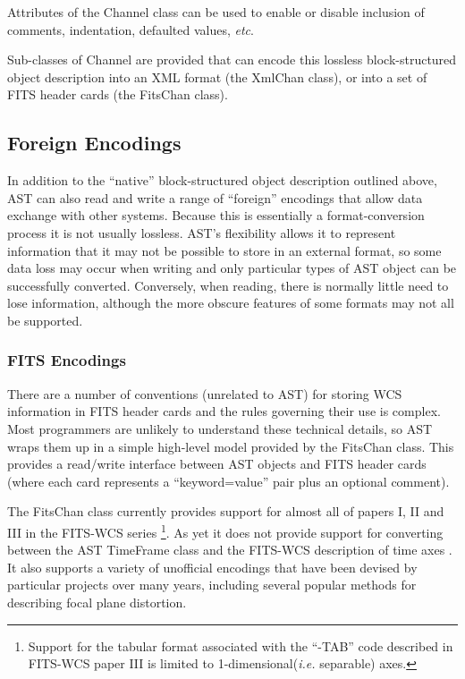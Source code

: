 \documentclass[final,authoryear,5p,times,twocolumn]{elsarticle}
\begin{document}
Attributes of the Channel class can be used to enable or disable
inclusion of comments, indentation, defaulted values, \emph{etc}.

Sub-classes of Channel are provided that can encode this lossless
block-structured object description into an XML format (the XmlChan
class), or into a set of FITS header cards (the FitsChan class).

\subsection{Foreign Encodings}

In addition to the ``native'' block-structured object description outlined
above, AST can also read and write a range of ``foreign'' encodings that
allow data exchange with other systems. Because this is essentially a
format-conversion process it is not usually lossless. AST's flexibility
allows it to represent information that it may not be possible to store
in an external format, so some data loss may occur when writing and only
particular types of AST object can be successfully converted. Conversely,
when reading, there is normally little need to lose information, although
the more obscure features of some formats may not all be supported.


\subsubsection{FITS Encodings}
\label{sec:fitsencodings}
There are a number of conventions (unrelated to AST) for storing WCS
information in FITS header cards and the rules governing their use is
complex. Most programmers are unlikely to understand these technical
details, so AST wraps them up in a simple high-level model provided by
the FitsChan class. This provides a read/write interface between AST
objects and FITS header cards (where each card represents a
``keyword=value'' pair plus an optional comment).

The FitsChan class currently provides support for almost all of papers
I, II and III  in the FITS-WCS series \citep{FITSWCSI,FITSWCSII,FITSWCSIII}
\footnote{Support for the tabular format associated with the ``-TAB'' code
described in FITS-WCS paper III is limited to 1-dimensional(\emph{i.e.}
separable) axes.}. As yet it does not provide support for converting
between the AST TimeFrame class and the FITS-WCS description of time
axes \citep{FITSWCSIV}. It also supports a variety of unofficial encodings
that have been devised by particular projects over many years, including
several popular methods for describing focal plane distortion.
\end{document}
